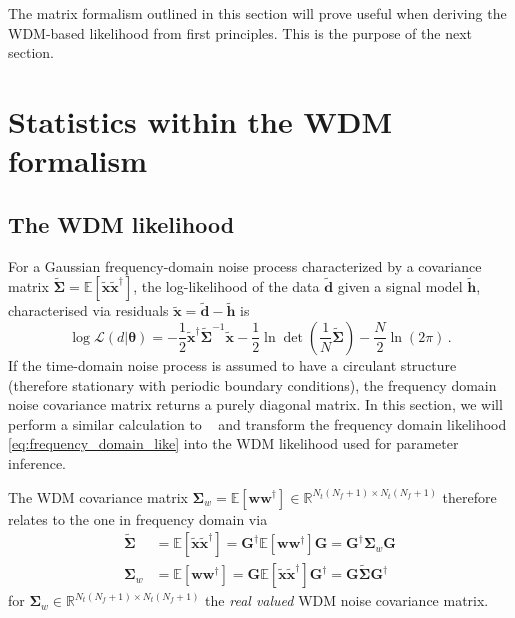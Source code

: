 \documentclass[twocolumn,preprintnumbers,
  superscriptaddress,
  nofootinbib,
  amsmath,
  amssymb,
  aps,
  prd,
  colorlinks=true,
  linkcolor=blue,
  urlcolor=blue,
  citecolor=blue,
  anchorcolor=blue
]{revtex4-2}
\begin{document}
The matrix formalism outlined in this section will prove useful when deriving the WDM-based likelihood from first principles. This is the purpose of the next section. 

\section{Statistics within the WDM formalism}\label{sec:stats}

\subsection{The WDM likelihood}

For a Gaussian frequency-domain noise process characterized by a covariance matrix $\boldsymbol{\tilde \Sigma} = \mathbb{E}[\boldsymbol{\tilde x}\boldsymbol{\tilde x}^\dagger]$,
the log-likelihood of the data $\mathbf{\tilde d}$ given a signal model $\mathbf{\tilde h}$, characterised via residuals $\boldsymbol{\tilde x} = \boldsymbol{\tilde d} - \boldsymbol{\tilde h}$ is \cite{Burke:2025bun}
\begin{equation}\label{eq:frequency_domain_like}
    \log \mathcal{L}(d|\boldsymbol{\theta}) = -\frac{1}{2}\tilde{\boldsymbol{x}}^{\dagger}\tilde{\boldsymbol{\Sigma}}^{-1}\tilde{\boldsymbol{x}} - \frac{1}{2}\ln\det \left(\frac{1}{N}\tilde{\boldsymbol{\Sigma}}\right) - \frac{N}{2}\ln(2\pi)\,.
\end{equation}
%
If the time-domain noise process is assumed to have a circulant structure (therefore stationary with periodic boundary conditions), the frequency domain noise covariance matrix returns a purely diagonal matrix. In this section, we will perform a similar calculation to ~\cite{Burke:2025bun} and transform the frequency domain likelihood \eqref{eq:frequency_domain_like} into the WDM likelihood used for parameter inference.  


The WDM covariance matrix $\boldsymbol{\Sigma}_{w}=\mathbb{E}[\boldsymbol{w}\boldsymbol{w}^{\dagger}]\in\mathbb{R}^{N_t(N_f+1)\times N_t(N_f +1)}$ therefore relates to the one in frequency domain via
%
\begin{align}
    \tilde{\boldsymbol{\Sigma}} &= \mathbb{E}[\tilde{\boldsymbol{x}}\tilde{\boldsymbol{x}}^{\dagger}] = \boldsymbol{G}^{\dagger}\mathbb{E}[\boldsymbol{w}\boldsymbol{w}^{\dagger}]\boldsymbol{G} = \boldsymbol{G}^{\dagger}\boldsymbol{\Sigma}_{w}\boldsymbol{G} \label{def:cov_freq_matrix}\\
    \boldsymbol{\Sigma}_w &= \mathbb{E}[\boldsymbol{w}\boldsymbol{w}^{\dagger}] = \boldsymbol{G}\mathbb{E}[\tilde{\boldsymbol{x}}\tilde{\boldsymbol{x}}^{\dagger}]\boldsymbol{G}^{\dagger} = \boldsymbol{G}\tilde{\boldsymbol{\Sigma}}\boldsymbol{G}^\dagger \label{def:cov_wdm_matrix}
\end{align}
%
for $\boldsymbol{\Sigma}_{w}\in\mathbb{R}^{N_t(N_f+1)\times N_t(N_f +1)}$ the \emph{real valued} WDM noise covariance matrix. 
\end{document}
